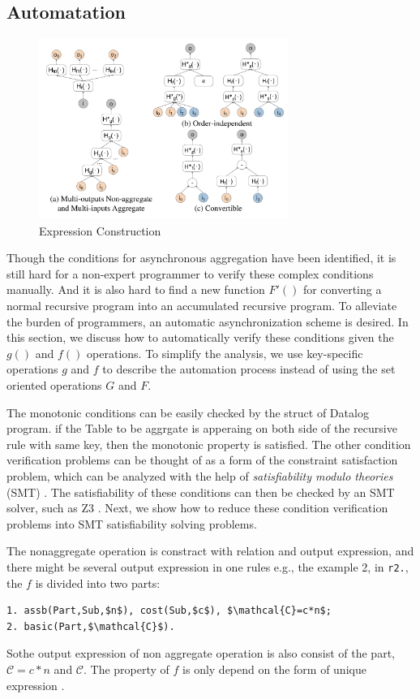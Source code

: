 \subsection{Automatation}
\begin{figure}[!t]
	\centering
	\includegraphics[width=3.2in]{figuration/automodel.pdf}
	\vspace{-0.1in}
	\caption{Expression Construction}
	\label{fig:automodel}
	\vspace{-0.1in}
\end{figure}
Though the conditions for asynchronous aggregation have been identified, it is still hard for a non-expert programmer to verify these complex conditions manually. And it is also hard to find a new function $F'()$ for converting a normal recursive program into an accumulated recursive program.
 To alleviate the burden of programmers, an automatic asynchronization scheme is desired. In this section, we discuss how to automatically verify these conditions given the $g()$ and $f()$ operations. To simplify the analysis, we use key-specific operations $g$ and $f$ to describe the automation process instead of using the set oriented operations $G$ and $F$.
 
The monotonic conditions can be easily checked by the struct of Datalog program. if the Table to be aggrgate is apperaing on both side of the recursive rule with same key, then the monotonic property is satisfied. The other condition verification problems can be thought of as a form of the constraint satisfaction problem, which can be analyzed with the help of \emph{satisfiability modulo theories} (SMT) \cite{53e486195688442995f82bfe28c55731}. The satisfiability of these conditions can then be checked by an SMT solver, such as Z3 \cite{DeMoura:2008:ZES:1792734.1792766}. Next, we show how to reduce these condition verification problems into SMT satisfiability solving problems.

The nonaggregate operation is constract with relation and output expression, and there might be several output expression in one rules e.g., the example 2, in \texttt{r2.}, the $f$ is divided into two parts:
\begin{lstlisting}
1. assb(Part,Sub,$n$), cost(Sub,$c$), $\mathcal{C}=c*n$;
2. basic(Part,$\mathcal{C}$).
\end{lstlisting}
Sothe output expression of non aggregate operation is also consist of the part, $\mathcal{C}=c*n$ and  $\mathcal{C}$. The property of $f$ is only depend on the form of unique expression .


